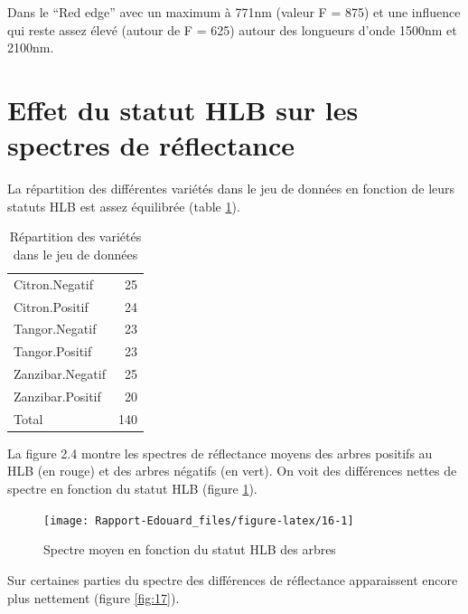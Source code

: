 \documentclass[
  11pt,
  french,
  a4paper,
  extrafontsizes,onecolumn,openright
  ]{memoir}
\begin{document}
\normalsize

Dans le ``Red edge'' avec un maximum à 771nm (valeur F = 875) et une influence qui reste assez élevé (autour de F = 625) autour des longueurs d'onde 1500nm et 2100nm.

\vfill
\newpage

\hypertarget{effet-du-statut-hlb-sur-les-spectres-de-ruxe9flectance}{%
\section{Effet du statut HLB sur les spectres de réflectance}\label{effet-du-statut-hlb-sur-les-spectres-de-ruxe9flectance}}

La répartition des différentes variétés dans le jeu de données en fonction de leurs statuts HLB est assez équilibrée (table \ref{tab:T1}).

\scriptsize

\begin{longtable}[t]{lr}
\caption{\label{tab:T1}Répartition des variétés dans le jeu de données}\\
\toprule
Citron.Negatif & 25\\
Citron.Positif & 24\\
Tangor.Negatif & 23\\
Tangor.Positif & 23\\
Zanzibar.Negatif & 25\\
\addlinespace
Zanzibar.Positif & 20\\
Total & 140\\
\bottomrule
\end{longtable}

\normalsize

La figure 2.4 montre les spectres de réflectance moyens des arbres positifs au HLB (en rouge) et des arbres négatifs (en vert). On voit des différences nettes de spectre en fonction du statut HLB (figure \ref{fig:16}).

\scriptsize

\begin{figure}

{\centering \texttt{[image: Rapport-Edouard\_files/figure-latex/16-1]} 

}

\caption{Spectre moyen en fonction du statut HLB des arbres}\label{fig:16}
\end{figure}

\normalsize

Sur certaines parties du spectre des différences de réflectance apparaissent encore plus nettement (figure \ref{fig:17}).
\end{document}
